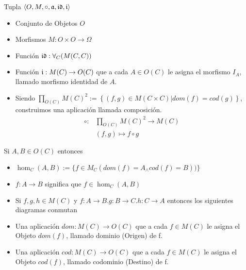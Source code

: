 \begin{defn}[Categoría]
\end{defn}
Tupla $\langle O,M,\circ,\mathfrak{a},\mathfrak{id},\mathfrak{i} \rangle$ 
\begin{itemize}
\item Conjunto de Objetos $O$
\item Morfismos $M: O \times O \to \Omega$
\item Función $\mathfrak{id} : \forall_C (M(C,C))$
\item Función $\mathfrak{i} : M(C) \to O(C)$ que a cada $A \in O(C)$ le
asigna el morfismo $I_A$, llamado morfismo identidad de $A$.
\item Siendo $\displaystyle \prod_{O(C)} M(C)^2 := \left\lbrace (f, g) \in M(C \times C) | dom(f)=cod(g) \right\rbrace$, construimos una aplicación llamada composición.
\begin{align*}
  \displaystyle \circ: & \prod_{O(C)} M(C)^2  \to M(C) \\
					   & (f,g) 					  \mapsto f \circ g
\end{align*}
\end{itemize}

\begin{note}
Si $A,B \in O(C)$ entonces 

\end{note}
\begin{itemize}
\item $\hom_{C}(A,B):= \{ f \in M_{C}(dom(f)=A _{\wedge} cod(f)=B)) \}$
\item $f: A \to B$ significa que $f \in \hom_{C}(A,B)$
\item Si $f,g,h \in M(C)$ y $f:A \to B.g:B \to C.h:C \to A$ entonces los siguientes diagramas conmutan

\begin{figure}
\centerline{
		}
\end{figure}
	
\end{itemize}

\begin{defn}
\end{defn}
\begin{itemize}
\item Una aplicación $dom : M(C) \to O(C)$ que a cada $f \in M(C)$ le
asigna el Objeto $dom(f)$, llamado dominio (Origen) de f.
\item Una aplicación $cod : M(C) \to O(C)$ que a cada $f \in M(C)$ le
asigna el Objeto $cod(f)$, llamado codominio (Destino) de f.
\end{itemize}

